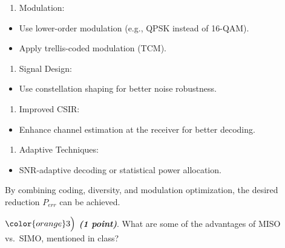 \documentclass[11pt]{article}
\providecommand{\tightlist}{%
      \setlength{\itemsep}{0pt}\setlength{\parskip}{0pt}}
\begin{document}
\begin{enumerate}
\def\labelenumi{\arabic{enumi}.}
\setcounter{enumi}{2}
\tightlist
\item
  Modulation:
\end{enumerate}

\begin{itemize}
\tightlist
\item
  Use lower-order modulation (e.g., QPSK instead of 16-QAM).
\item
  Apply trellis-coded modulation (TCM).
\end{itemize}

\begin{enumerate}
\def\labelenumi{\arabic{enumi}.}
\setcounter{enumi}{3}
\tightlist
\item
  Signal Design:
\end{enumerate}

\begin{itemize}
\tightlist
\item
  Use constellation shaping for better noise robustness.
\end{itemize}

\begin{enumerate}
\def\labelenumi{\arabic{enumi}.}
\setcounter{enumi}{4}
\tightlist
\item
  Improved CSIR:
\end{enumerate}

\begin{itemize}
\tightlist
\item
  Enhance channel estimation at the receiver for better decoding.
\end{itemize}

\begin{enumerate}
\def\labelenumi{\arabic{enumi}.}
\setcounter{enumi}{5}
\tightlist
\item
  Adaptive Techniques:
\end{enumerate}

\begin{itemize}
\tightlist
\item
  SNR-adaptive decoding or statistical power allocation.
\end{itemize}

By combining coding, diversity, and modulation optimization, the desired
reduction \(P_{err}\) can be achieved.

    \(\color{orange}3\Bigl)\) \textbf{\emph{(1 point)}}. What are some of
the advantages of MISO vs.~SIMO, mentioned in class?
\end{document}
